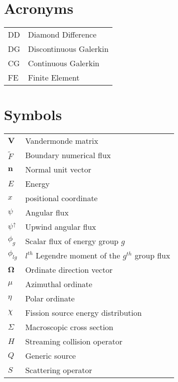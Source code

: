 
\section*{Acronyms}
\begin{tabular}{l l}
DD & Diamond Difference \\
DG & Discontinuous Galerkin \\
CG & Continuous Galerkin \\
FE & Finite Element
\end{tabular}

\section*{Symbols}
\begin{tabular}{l l}
$\mathbf V$ & Vandermonde matrix \\
$\tilde F$ & Boundary numerical flux \\
$\mathbf n$ & Normal unit vector \\
$E$ & Energy \\
$x$ & positional coordinate \\
$\psi$ & Angular flux \\
$\psi^{\uparrow}$ & Upwind angular flux \\
$\phi_g$ & Scalar flux of energy group $g$ \\
$\phi_{lg}$ & $l^{th}$ Legendre moment of the $g^{th}$ group flux \\
$\mathbf \Omega$ & Ordinate direction vector \\
$\mu$ & Azimuthal ordinate \\
$\eta$ & Polar ordinate \\
$\chi$  & Fission source energy distribution \\
$\Sigma$ & Macroscopic cross section \\
$H$ & Streaming collision operator \\
$Q$ & Generic source \\
$S$ & Scattering operator \\
\end{tabular}

\pagebreak
